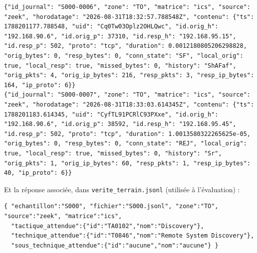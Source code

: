\begin{lstlisting}[style=jsonfull]
{"id_journal": "S000-0006", "zone": "TO", "matrice": "ics", "source": "zeek", "horodatage": "2026-08-31T18:32:57.788548Z", "contenu": {"ts": 1788201177.788548, "uid": "Cq0Tw03Oplz2OHLQwc", "id.orig_h": "192.168.90.6", "id.orig_p": 37310, "id.resp_h": "192.168.95.15", "id.resp_p": 502, "proto": "tcp", "duration": 0.0012180805206298828, "orig_bytes": 0, "resp_bytes": 0, "conn_state": "SF", "local_orig": true, "local_resp": true, "missed_bytes": 0, "history": "ShAFaf", "orig_pkts": 4, "orig_ip_bytes": 216, "resp_pkts": 3, "resp_ip_bytes": 164, "ip_proto": 6}}
{"id_journal": "S000-0007", "zone": "TO", "matrice": "ics", "source": "zeek", "horodatage": "2026-08-31T18:33:03.614345Z", "contenu": {"ts": 1788201183.614345, "uid": "CyfTL91PCRlC93PXxe", "id.orig_h": "192.168.90.6", "id.orig_p": 38592, "id.resp_h": "192.168.95.45", "id.resp_p": 502, "proto": "tcp", "duration": 1.0013580322265625e-05, "orig_bytes": 0, "resp_bytes": 0, "conn_state": "REJ", "local_orig": true, "local_resp": true, "missed_bytes": 0, "history": "Sr", "orig_pkts": 1, "orig_ip_bytes": 60, "resp_pkts": 1, "resp_ip_bytes": 40, "ip_proto": 6}}
\end{lstlisting}

\noindent Et la réponse associée, dans \texttt{verite\_terrain.jsonl} (utilisée à l'évaluation) :

\begin{lstlisting}[style=json]
{ "echantillon":"S000", "fichier":"S000.jsonl", "zone":"TO", "source":"zeek", "matrice":"ics",
  "tactique_attendue":{"id":"TA0102","nom":"Discovery"},
  "technique_attendue":{"id":"T0846","nom":"Remote System Discovery"},
  "sous_technique_attendue":{"id":"aucune","nom":"aucune"} }
\end{lstlisting}
